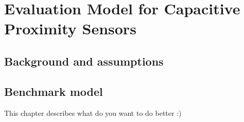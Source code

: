 \chapter{Evaluation Model for Capacitive Proximity Sensors}
\section{Background and assumptions}
\section{Benchmark model}
This chapter describes what do you want to do better :)